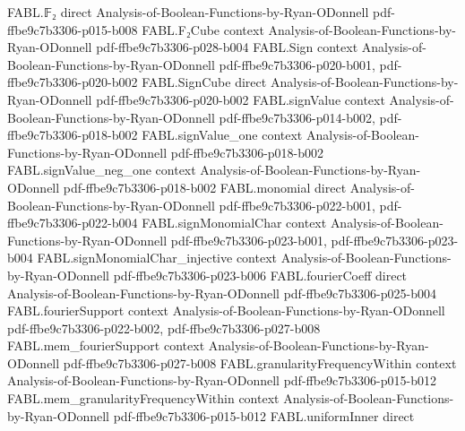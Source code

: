 \begin{theorem}
\label{FABL.isOddWeightString_of_partialSumChecks}
\leanok
{}
\proofstep
  {FABL.𝔽₂}
  {direct}
  {Analysis-of-Boolean-Functions-by-Ryan-ODonnell}
  {pdf-ffbe9c7b3306-p015-b008}
\proofstep
  {FABL.F₂Cube}
  {context}
  {Analysis-of-Boolean-Functions-by-Ryan-ODonnell}
  {pdf-ffbe9c7b3306-p028-b004}
\proofstep
  {FABL.Sign}
  {context}
  {Analysis-of-Boolean-Functions-by-Ryan-ODonnell}
  {pdf-ffbe9c7b3306-p020-b001,
    pdf-ffbe9c7b3306-p020-b002}
\proofstep
  {FABL.SignCube}
  {direct}
  {Analysis-of-Boolean-Functions-by-Ryan-ODonnell}
  {pdf-ffbe9c7b3306-p020-b002}
\proofstep
  {FABL.signValue}
  {context}
  {Analysis-of-Boolean-Functions-by-Ryan-ODonnell}
  {pdf-ffbe9c7b3306-p014-b002,
    pdf-ffbe9c7b3306-p018-b002}
\proofstep
  {FABL.signValue_one}
  {context}
  {Analysis-of-Boolean-Functions-by-Ryan-ODonnell}
  {pdf-ffbe9c7b3306-p018-b002}
\proofstep
  {FABL.signValue_neg_one}
  {context}
  {Analysis-of-Boolean-Functions-by-Ryan-ODonnell}
  {pdf-ffbe9c7b3306-p018-b002}
\proofstep
  {FABL.monomial}
  {direct}
  {Analysis-of-Boolean-Functions-by-Ryan-ODonnell}
  {pdf-ffbe9c7b3306-p022-b001,
    pdf-ffbe9c7b3306-p022-b004}
\proofstep
  {FABL.signMonomialChar}
  {context}
  {Analysis-of-Boolean-Functions-by-Ryan-ODonnell}
  {pdf-ffbe9c7b3306-p023-b001,
    pdf-ffbe9c7b3306-p023-b004}
\proofstep
  {FABL.signMonomialChar_injective}
  {context}
  {Analysis-of-Boolean-Functions-by-Ryan-ODonnell}
  {pdf-ffbe9c7b3306-p023-b006}
\proofstep
  {FABL.fourierCoeff}
  {direct}
  {Analysis-of-Boolean-Functions-by-Ryan-ODonnell}
  {pdf-ffbe9c7b3306-p025-b004}
\proofstep
  {FABL.fourierSupport}
  {context}
  {Analysis-of-Boolean-Functions-by-Ryan-ODonnell}
  {pdf-ffbe9c7b3306-p022-b002,
    pdf-ffbe9c7b3306-p027-b008}
\proofstep
  {FABL.mem_fourierSupport}
  {context}
  {Analysis-of-Boolean-Functions-by-Ryan-ODonnell}
  {pdf-ffbe9c7b3306-p027-b008}
\proofstep
  {FABL.granularityFrequencyWithin}
  {context}
  {Analysis-of-Boolean-Functions-by-Ryan-ODonnell}
  {pdf-ffbe9c7b3306-p015-b012}
\proofstep
  {FABL.mem_granularityFrequencyWithin}
  {context}
  {Analysis-of-Boolean-Functions-by-Ryan-ODonnell}
  {pdf-ffbe9c7b3306-p015-b012}
\proofstep
  {FABL.uniformInner}
  {direct}

\end{theorem}
